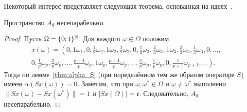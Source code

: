 Некоторый интерес представляет следующая теорема,
основанная на идеях~\cite{usachev2009_phd_vsu}.

\begin{theorem}
	Пространство $A_0$ несепарабельно.
\end{theorem}

\begin{proof}
	Пусть $\Omega = \{0;1\}^{\mathbb{N}}$.
	Для каждого $\omega\in\Omega$ положим
	\begin{multline}
		\label{eq:x_omega_alpha_c}
		x(\omega)=\left(
			0, 1\omega_1,
			0, \frac{1}{2}\omega_2, 1\omega_2, \frac{1}{2}\omega_2,
			0, \frac{1}{3}\omega_3, \frac{2}{3}\omega_3, 1\omega_3, \frac{2}{3}\omega_3, \frac{1}{3}\omega_3,
			0, ...,
		\right. \\ \left.
			0, \frac{1}{p}\omega_p, \frac{2}{p}\omega_p, ..., \frac{p-1}{p}\omega_p, 1\omega_p,
				\frac{p-1}{p}\omega_p, ..., \frac{2}{p}\omega_p, \frac{1}{p}\omega_p,
			0, \frac{1}{p+1}\omega_{p+1}, ...
		\right).
	\end{multline}
	Тогда по лемме~\ref{thm:alpha_S} (при определённом тем же образом операторе $S$) имеем
	$\alpha(Sx(\omega)) = 0$.
	Заметим, что при $\omega,\omega^* \in \Omega$ и $\omega\neq\omega^*$ выполнено
	$\|Sx(\omega)-Sx(\omega^*)\|=1$ и $|Sx(\Omega)|=\mathfrak{c}$.
	Следовательно, $A_0$ несепарабельно.
\end{proof}


